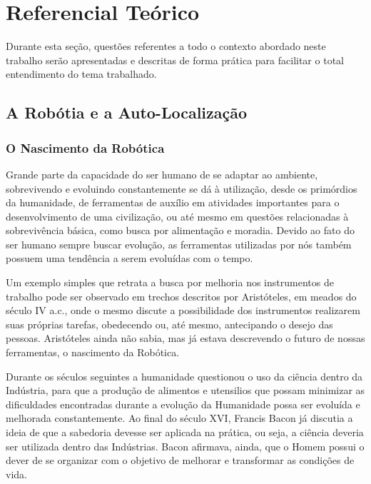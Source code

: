 
\chapter[Referencial Teórico]{Referencial Teórico}
	
	Durante esta seção, questões referentes a todo o contexto abordado neste trabalho serão apresentadas e descritas de forma prática para facilitar o total entendimento do tema trabalhado.

\section{A Robótia e a Auto-Localização}
	
	\subsection{O Nascimento da Robótica} %
	\label{sub:o_nascimento_da_robotica}

	Grande parte da capacidade do ser humano de se adaptar ao ambiente, sobrevivendo e evoluindo constantemente se dá à utilização, desde os primórdios da humanidade, de ferramentas de auxílio em atividades importantes para o desenvolvimento de uma civilização, ou até mesmo em questões relacionadas à sobrevivência básica, como busca por alimentação e moradia. Devido ao fato do ser humano sempre buscar evolução, as ferramentas utilizadas por nós também possuem uma tendência a serem evoluídas com o tempo.

	Um exemplo simples que retrata a busca por melhoria nos instrumentos de trabalho pode ser observado em trechos descritos por Aristóteles, em meados do século IV a.c., onde o mesmo discute a possibilidade dos instrumentos realizarem suas próprias tarefas, obedecendo ou, até mesmo, antecipando o desejo das pessoas. Aristóteles ainda não sabia, mas já estava descrevendo o futuro de nossas ferramentas, o nascimento da Robótica.

	Durante os séculos seguintes a humanidade questionou o uso da ciência dentro da Indústria, para que a produção de alimentos e utensilios que possam minimizar as dificuldades encontradas durante a evolução da Humanidade possa ser evoluída e melhorada constantemente. Ao final do século XVI, Francis Bacon já discutia a ideia de que a sabedoria devesse ser aplicada na prática, ou seja, a ciência deveria ser utilizada dentro das Indústrias. Bacon afirmava, ainda, que o Homem possui o dever de se organizar com o objetivo de melhorar e transformar as condições de vida.

